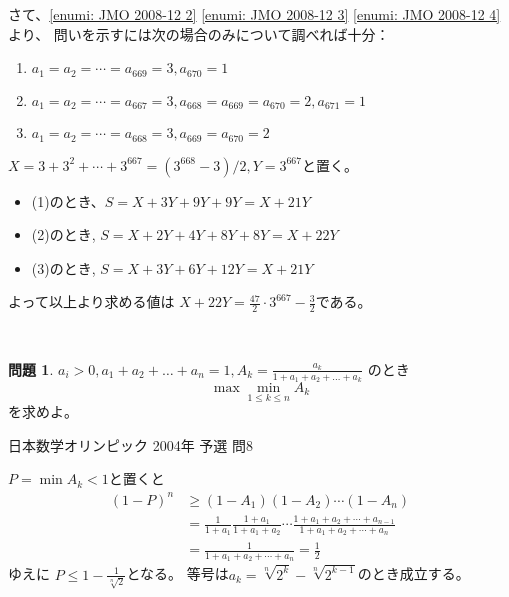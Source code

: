 \documentclass[uplatex, a5paper]{jsarticle}
\makeatletter
\theoremstyle{definition}
\newtheorem{prob}{問題}
\renewenvironment{proof}[1][\proofname]{
  \pushQED{\qed}%
  \normalfont \topsep6\p@\@plus6\p@\relax
  \trivlist
  \item[\hskip\labelsep
    #1\@addpunct{\textbf{.}}]\ignorespaces
}{%
  \popQED\endtrivlist\@endpefalse
}
\providecommand{\proofname}{証明}
\def\qed{\hfill $\Box$}
\makeatother
\begin{document}
\begin{proof}
  さて、\ref{enumi: JMO 2008-12 2} \ref{enumi: JMO 2008-12 3} \ref{enumi: JMO 2008-12 4}より、
  問いを示すには次の場合のみについて調べれば十分：
  \begin{enumerate}
    \item \(a_1=a_2=\cdots =a_{669}=3, a_{670}=1\)
    \item \(a_1=a_2=\cdots =a_{667}=3, a_{668}=a_{669}=a_{670}=2, a_{671}=1\)
    \item \(a_1=a_2=\cdots =a_{668}=3, a_{669}=a_{670}=2\)
  \end{enumerate}
  \(X=3+3^2+ \cdots +3^{667} = (3^{668}-3)/2 , Y=3^{667}\)と置く。
  \begin{itemize}
    \item (1)のとき、\(S=X+3Y+9Y+9Y=X+21Y\)
    \item (2)のとき, \(S=X+2Y+4Y+8Y+8Y=X+22Y\)
    \item (3)のとき, \(S=X+3Y+6Y+12Y=X+21Y\)
  \end{itemize}
  よって以上より求める値は
  \(X+22Y=\displaystyle\frac{47}{2}\cdot 3^{667}-\frac{3}{2}\)である。
\end{proof}









\



\newpage

\begin{prob}
  \(a_i > 0 , a_1 + a_2 + \ldots + a_n = 1 , A_k = \displaystyle\frac{a_k}{1 + a_1 + a_2 + \ldots + a_k}\)
  のとき
  \[
  \max \min_{1\leq k \leq n}A_k
  \]
  を求めよ。
  \begin{flushright}
    日本数学オリンピック 2004年 予選 問8
  \end{flushright}
\end{prob}


\begin{proof}
  \(P=\min A_k < 1\)と置くと
  \begin{align*}
    (1-P)^n &\geq (1-A_1)(1-A_2)\cdots (1-A_n) \\
    &= \frac{1}{1+a_1}\frac{1+a_1}{1+a_1+a_2}\cdots \frac{1+a_1+a_2+\cdots +a_{n-1}}{1+a_1+a_2+\cdots +a_n} \\
    &= \frac{1}{1+a_1+a_2+\cdots +a_n}=\frac{1}{2}
  \end{align*}
  ゆえに
  \(P \leq 1- \displaystyle\frac{1}{\sqrt[n]{2}}\)となる。
  等号は\(a_k=\sqrt[n]{2^k} - \sqrt[n]{2^{k-1}}\)のとき成立する。
\end{proof}
\end{document}
